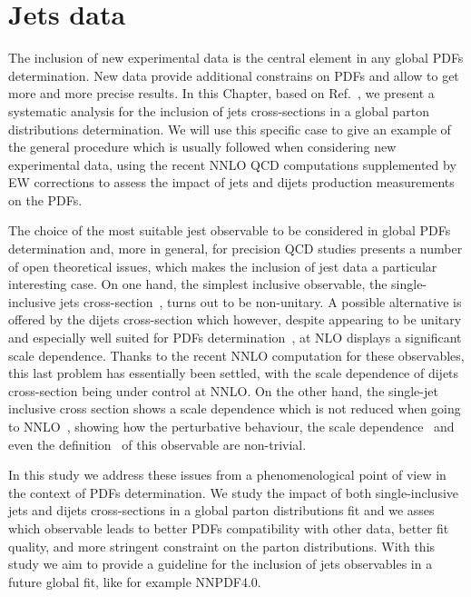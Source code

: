\chapter{Jets data}
\label{ch:jets}
The inclusion of new experimental data is the central element in any global PDFs determination.
New data provide additional constrains on PDFs and allow to get more and more precise results. 
In this Chapter, based on Ref.~\cite{AbdulKhalek:2020jut}, we present a systematic analysis for the inclusion 
of jets cross-sections in a global parton distributions determination.
We will use this specific case to give an example of the general procedure which is usually followed 
when considering new experimental data, using the recent NNLO QCD computations
supplemented by EW corrections to assess the impact of jets and dijets production measurements on the PDFs. 

% 
The choice of the most suitable jest observable to be considered in global PDFs determination and, more in general,
for precision QCD studies presents a number of open theoretical issues, which makes the inclusion of
jest data a particular interesting case.
On one hand, the simplest inclusive observable, 
the single-inclusive jets cross-section~\cite{Ellis:1990ek,Aversa:1988fv}, turns out to be non-unitary.
A possible alternative is offered by the dijets cross-section which however, despite appearing to be 
unitary and especially well suited for PDFs determination~\cite{Giele:1994xd}, at NLO displays a significant scale dependence. 
Thanks to the recent NNLO computation for these observables, this last problem has essentially been settled,
with the scale dependence of dijets cross-section being under control at NNLO.
On the other hand, the single-jet inclusive cross section
shows a scale dependence which is not reduced when going to NNLO~\cite{Currie:2017ctp}, 
showing how the perturbative behaviour, the scale dependence~\cite{Currie:2018xkj} and even the definition~\cite{Cacciari:2019qjx} 
of this observable are non-trivial.  

%
In this study we address these issues from a phenomenological point of view in the context of PDFs determination. 
We study the impact of both single-inclusive
jets and dijets cross-sections in a global parton distributions fit and we
asses which observable leads to better PDFs compatibility with other data, better fit quality,
and more stringent constraint on the parton distributions. 
With this study we aim to provide a guideline for the inclusion of jets observables in a future global fit,
like for example NNPDF4.0.

